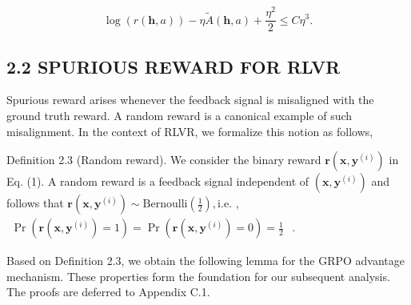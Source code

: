 \documentclass[
  10
]{article}
\begin{document}
\[
\log (r (\mathbf {h}, a)) - \eta \tilde {A} (\mathbf {h}, a) + \frac {\eta^ {2}}{2} \leq C \eta^ {3}. \tag {4}
\]

\subsection{2.2 SPURIOUS REWARD FOR
RLVR}\label{spurious-reward-for-rlvr}

Spurious reward arises whenever the feedback signal is misaligned with
the ground truth reward. A random reward is a canonical example of such
misalignment. In the context of RLVR, we formalize this notion as
follows,

Definition 2.3 (Random reward). We consider the binary reward
\(\mathbf { r } ( \mathbf { x } , \mathbf { y } ^ { ( i ) } )\) in Eq.
(1). A random reward is a feedback signal independent of
\(( \mathbf x , \mathbf y ^ { ( i ) } )\) and follows that
\(\mathbf { r } ( \mathbf { x } , \mathbf { y } ^ { ( i ) } ) \sim \mathrm { B e r n o u l l i } ( \frac { 1 } { 2 } ) , \mathrm { i . e . }\)
,
\(\begin{array} { r } { \operatorname* { P r } ( \mathbf { r } ( \mathbf { x } , \mathbf { y } ^ { ( i ) } ) = 1 ) = \operatorname* { P r } ( \mathbf { r } ( \mathbf { x } , \mathbf { y } ^ { ( i ) } ) = 0 ) = \frac { 1 } { 2 } } \end{array}\)
.

Based on Definition 2.3, we obtain the following lemma for the GRPO
advantage mechanism. These properties form the foundation for our
subsequent analysis. The proofs are deferred to Appendix C.1.
\end{document}
